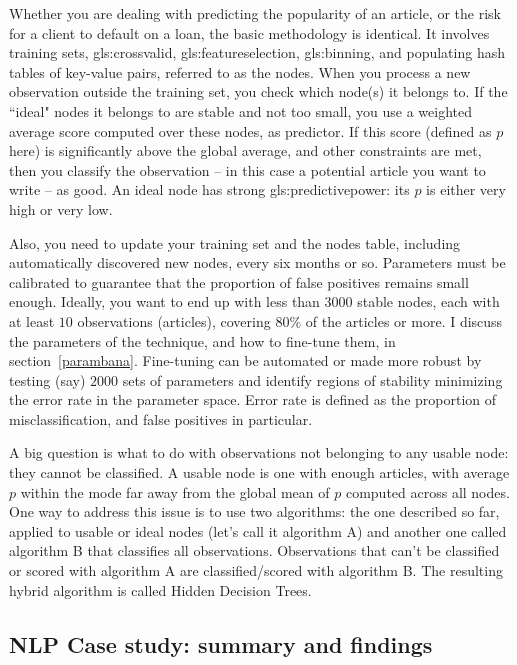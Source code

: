 \documentclass[oneside,10pt]{book}
\begin{document}
Whether you are dealing with predicting the popularity of an article, or the risk for a client to default on a loan, the basic methodology is identical. It involves training sets, \gls{gls:crossvalid}, \gls{gls:featureselection}, \gls{gls:binning}, and populating hash tables of key-value pairs, referred to as the nodes.
When you process a new observation outside the training set, you check which node(s) it belongs to. If the ``ideal" nodes it belongs to are stable and not too small, you use a weighted average score computed over these nodes, as predictor.  If this score (defined as $p$ here) is significantly above the global average, and other constraints are met, then you classify the observation -- in this case a potential article  you want to write -- as good. An ideal node has strong \gls{gls:predictivepower}: its $p$ is either
  very high or very low.

Also, you need to update your training set and the nodes table, including automatically discovered new nodes, every six months or so.
Parameters must be calibrated to guarantee that the proportion of false positives  remains small enough. Ideally, you want to end up with
 less than $\num{3000}$ stable nodes, each with at least $10$ observations (articles), covering $80\%$ of the articles or more.
I discuss the parameters of the technique, and how to fine-tune them, in section~\ref{parambana}. Fine-tuning can be automated or made more robust by testing (say)
$\num{2000}$ sets of parameters and identify regions of stability minimizing the error rate in the parameter space.  Error rate is defined as the proportion of misclassification, and false positives in particular.

A big question is what to do with observations not belonging to any usable node: they cannot be classified. A \textcolor{index}{usable node} is one with enough articles, with average $p$ within the mode far away from the global mean of $p$ computed across all nodes.
One way to address this issue is to use two algorithms: the one described so far, applied to usable or ideal nodes (let's call it algorithm A) and another one called algorithm B that classifies all observations. Observations that can't be classified or scored with algorithm A are classified/scored with algorithm B.
The resulting hybrid algorithm is called Hidden Decision Trees.


\subsection{NLP Case study: summary and findings}
\end{document}
